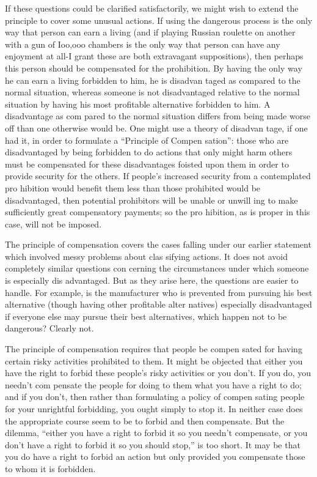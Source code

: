 \documentclass[11pt,openany]{book}
\begin{document}
If these questions could be clarified satisfactorily, we might wish to extend the principle to cover some unusual actions. If using the dangerous process is the only way that person can earn a living (and if playing Russian roulette on another with a gun of Ioo,ooo chambers is the only way that person can have any enjoyment at all-I grant these are both extravagant suppositions), then perhaps this person should be compensated for the prohibition. By having the only way he can earn a living forbidden to him, he is disadvan taged as compared to the normal situation, whereas someone is not disadvantaged relative to the normal situation by having his most profitable alternative forbidden to him. A disadvantage as com pared to the normal situation differs from being made worse off than one otherwise would be. One might use a theory of disadvan tage, if one had it, in order to formulate a ``Principle of Compen sation'': those who are disadvantaged by being forbidden to do actions that only might harm others must be compensated for these disadvantages foisted upon them in order to provide security for the others. If people's increased security from a contemplated pro hibition would benefit them less than those prohibited would be disadvantaged, then potential prohibitors will be unable or unwill ing to make sufficiently great compensatory payments; so the pro hibition, as is proper in this case, will not be imposed. 

The principle of compensation covers the cases falling under our earlier statement which involved messy problems about clas sifying actions. It does not avoid completely similar questions con cerning the circumstances under which someone is especially dis advantaged. But as they arise here, the questions are easier to handle. For example, is the manufacturer who is prevented from pursuing his best alternative (though having other profitable alter natives) especially disadvantaged if everyone else may pursue their best alternatives, which happen not to be dangerous? Clearly not. 

The principle of compensation requires that people be compen sated for having certain risky activities prohibited to them. It might be objected that either you have the right to forbid these people's risky activities or you don't. If you do, you needn't com pensate the people for doing to them what you have a right to do; and if you don't, then rather than formulating a policy of compen sating people for your unrightful forbidding, you ought simply to stop it. In neither case does the appropriate course seem to be to forbid and then compensate. But the dilemma, ``either you have a right to forbid it so you needn't compensate, or you don't have a right to forbid it so you should stop,'' is too short. It may be that you do have a right to forbid an action but only provided you compensate those to whom it is forbidden. 
\end{document}
